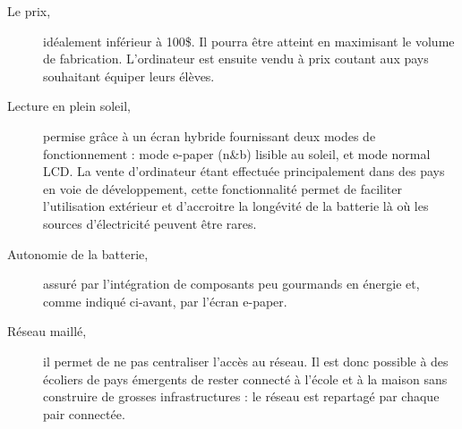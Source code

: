 \begin{description}
  \item [Le prix,] idéalement inférieur à 100\$. Il pourra être atteint en maximisant le volume de fabrication. L'ordinateur est ensuite vendu à prix coutant aux pays souhaitant équiper leurs élèves.
  \item [Lecture en plein soleil,] permise grâce à un écran hybride fournissant deux modes de fonctionnement : mode e-paper (n\&{}b) lisible au soleil, et mode normal LCD. La vente d'ordinateur étant effectuée principalement dans des pays en voie de développement, cette fonctionnalité permet de faciliter l'utilisation extérieur et d'accroitre la longévité de la batterie là où les sources d'électricité peuvent être rares.
  \item [Autonomie de la batterie,] assuré par l'intégration de composants peu gourmands en énergie et, comme indiqué ci-avant, par l'écran e-paper.
  \item [Réseau maillé,] il permet de ne pas centraliser l'accès au réseau. Il est donc possible à des écoliers de pays émergents de rester connecté à l'école et à la maison sans construire de grosses infrastructures : le réseau est repartagé par chaque pair connectée.
\end{description}

